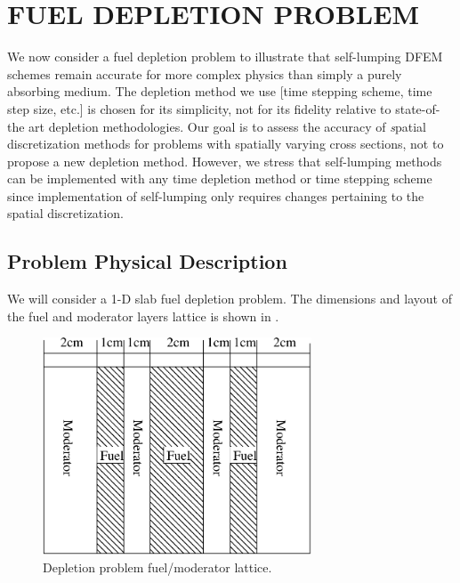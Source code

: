 %
%
%



\chapter{\uppercase{Fuel Depletion Problem}}
\label{sec:chapter5_depletion}

We now consider a fuel depletion problem to illustrate that self-lumping DFEM schemes remain accurate for more complex physics than simply a purely absorbing medium.
The depletion method we use [time stepping scheme, time step size, etc.] is chosen for its simplicity, not for its fidelity relative to state-of-the art depletion methodologies.  
Our goal is to assess the accuracy of {\emph spatial discretization} methods for problems with spatially varying cross sections, not to propose a new depletion method.  
However, we stress that self-lumping methods can be implemented with any time depletion method or time stepping scheme since implementation of self-lumping  only requires changes pertaining to the spatial discretization. 

\section{Problem Physical Description}

We will consider a 1-D slab fuel depletion problem.
The dimensions and layout of the fuel and moderator layers lattice is shown in .  
\begin{figure}[!htp]
\begin{center}
\includegraphics[width=8cm]{chapter5_depletion/article_grid.pdf}
\end{center}
\caption{Depletion problem fuel/moderator lattice.}
\label{fig:lattice}
\end{figure}

